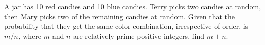 A jar has 10 red candies and 10 blue candies. Terry picks two candies at random, then Mary picks two of the remaining candies at random. Given that the probability that they get the same color combination, irrespective of order, is $m/n$, where $m$ and $n$ are relatively prime positive integers, find $m+n$.